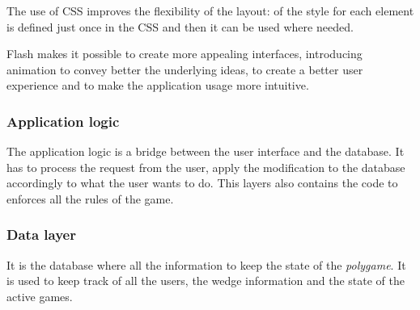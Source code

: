 The use of CSS improves the flexibility of the layout: of the style for each element is defined just once in the CSS and then it can be used where needed.

Flash makes it possible to create more appealing interfaces, introducing animation to convey better the underlying ideas, to create a better user experience and to make the application usage more intuitive.

\subsubsection{Application logic}
The application logic is a bridge between the user interface and the database. It has to process the request from the user, apply the modification to the database accordingly to what the user wants to do. This layers also contains the code to enforces all the rules of the game.

\subsubsection{Data layer}
It is the database where all the information to keep the state of the \emph{polygame}. It is used to keep track of all the users, the wedge information and the state of the active games.